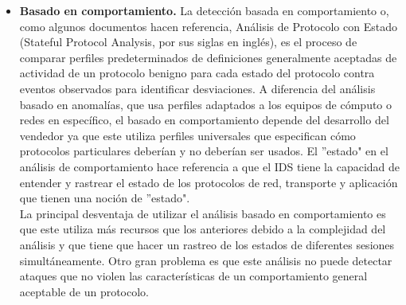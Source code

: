\begin{itemize}
	El beneficio que se obtiene con esta implementación es un reconocimiento de amenazas previamente desconocidas que afecten el comportamiento del sistema. Como lo que puede ocurrir cuando un sistema es infectado con \textit{malware}\footnote{Programa malicioso que su propósito es acceder a dispositivos de manera no autorizada y sin el conocimiento del usuario.}.\\
	
	Una de las notables desventajas que se presentan en esta técnica de análisis es la dificultad, en ocasiones, para determinar por qué una alerta fue generada y para validar que dicha alerta es acertada y no un falso positivo, esta desventaja se debe a la complejidad y número de eventos que pueden causar que la alerta sea generada.\\
	
	
	\item \textbf{Basado en comportamiento.}
	La detección basada en comportamiento o, como algunos documentos hacen referencia, Análisis de Protocolo con Estado (Stateful Protocol Analysis, por sus siglas en inglés), es el proceso de comparar perfiles predeterminados de definiciones generalmente aceptadas de actividad de un protocolo benigno para cada estado del protocolo contra eventos observados para identificar desviaciones. A diferencia  del análisis basado en anomalías, que usa perfiles adaptados a los equipos de cómputo o redes en específico, el basado en comportamiento depende del desarrollo del vendedor ya que este utiliza perfiles universales que especifican cómo protocolos particulares deberían y no deberían ser usados. El ''estado" en el análisis de comportamiento hace referencia a que el IDS tiene la capacidad de entender y rastrear el estado de los protocolos de red, transporte y aplicación que tienen una noción de ''estado".\\
	
	La principal desventaja de utilizar el análisis basado en comportamiento es que este utiliza más recursos que los anteriores debido a la complejidad del análisis y que tiene que hacer un rastreo de los estados de diferentes sesiones simultáneamente. Otro gran problema es que este análisis no puede detectar ataques que no violen las características de un comportamiento general aceptable de un protocolo.\\
	
\end{itemize}